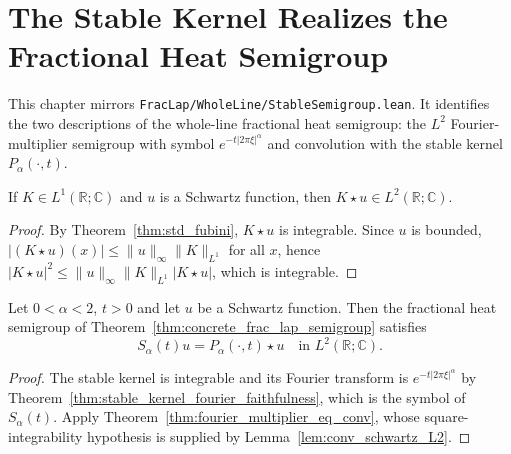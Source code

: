 \chapter{The Stable Kernel Realizes the Fractional Heat Semigroup}

This chapter mirrors \texttt{FracLap/WholeLine/StableSemigroup.lean}. It identifies the two descriptions of the whole-line fractional heat semigroup: the $L^2$ Fourier-multiplier semigroup with symbol $e^{-t \lvert 2\pi\xi \rvert^\alpha}$ and convolution with the stable kernel $P_\alpha(\cdot, t)$.

\begin{lemma}\label{lem:conv_schwartz_L2}
\leanok
If $K \in L^1(\mathbb{R}; \mathbb{C})$ and $u$ is a Schwartz function, then $K \star u \in L^2(\mathbb{R}; \mathbb{C})$.
\end{lemma}

\begin{proof}
\leanok
By Theorem~\ref{thm:std_fubini}, $K \star u$ is integrable. Since $u$ is bounded, $\lvert (K \star u)(x) \rvert \le \lVert u \rVert_\infty \lVert K \rVert_{L^1}$ for all $x$, hence $\lvert K \star u \rvert^2 \le \lVert u \rVert_\infty \lVert K \rVert_{L^1} \lvert K \star u \rvert$, which is integrable.
\end{proof}

\begin{theorem}\label{thm:stable_semigroup_convolution}
\leanok
Let $0 < \alpha < 2$, $t > 0$ and let $u$ be a Schwartz function. Then the fractional heat semigroup of Theorem~\ref{thm:concrete_frac_lap_semigroup} satisfies
\[
  S_\alpha(t) u = P_\alpha(\cdot, t) \star u \quad \text{in } L^2(\mathbb{R}; \mathbb{C}).
\]
\end{theorem}

\begin{proof}
\leanok
The stable kernel is integrable and its Fourier transform is $e^{-t \lvert 2\pi\xi \rvert^\alpha}$ by Theorem~\ref{thm:stable_kernel_fourier_faithfulness}, which is the symbol of $S_\alpha(t)$. Apply Theorem~\ref{thm:fourier_multiplier_eq_conv}, whose square-integrability hypothesis is supplied by Lemma~\ref{lem:conv_schwartz_L2}.
\end{proof}

